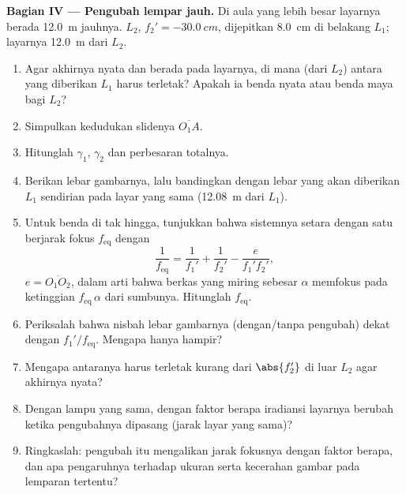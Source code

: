 \begin{problem}
\medskip
\noindent\textbf{Bagian IV --- Pengubah lempar jauh.}
Di aula yang lebih besar layarnya berada \qty{12.0}{m} jauhnya.  $L_2$, $f_2' = \qty{-30.0}{cm}$, dijepitkan \qty{8.0}{cm} di
belakang $L_1$; layarnya \qty{12.0}{m} dari $L_2$.
\begin{enumerate}[resume]
  \item Agar  akhirnya nyata dan berada pada layarnya, di mana
        (dari $L_2$)  antara yang diberikan $L_1$ harus
        terletak? Apakah ia benda nyata atau benda maya bagi $L_2$?
  \item Simpulkan kedudukan slidenya $\overline{O_1A}$.
  \item Hitunglah $\gamma_1$, $\gamma_2$ dan perbesaran totalnya.
  \item Berikan lebar gambarnya, lalu bandingkan dengan lebar yang akan
        diberikan $L_1$ sendirian pada layar yang sama (\qty{12.08}{m}
        dari $L_1$).
  \item Untuk benda di tak hingga, tunjukkan bahwa sistemnya setara
        dengan satu  berjarak fokus $f_{\mathrm{eq}}$ dengan
        \[
        \frac{1}{f_{\mathrm{eq}}} = \frac{1}{f_1'} + \frac{1}{f_2'} - \frac{e}{f_1' f_2'},
        \]
        $e = \overline{O_1O_2}$, dalam arti bahwa berkas yang miring
        sebesar $\alpha$ memfokus pada ketinggian
        $f_{\mathrm{eq}}\,\alpha$ dari sumbunya. Hitunglah
        $f_{\mathrm{eq}}$.
  \item Periksalah bahwa nisbah lebar gambarnya (dengan/tanpa pengubah)
        dekat dengan $f_1'/f_{\mathrm{eq}}$. Mengapa hanya hampir?
  \item Mengapa  antaranya harus terletak kurang dari
        $\abs{f_2'}$ di luar $L_2$ agar  akhirnya nyata?
  \item Dengan lampu yang sama, dengan faktor berapa iradiansi layarnya
        berubah ketika pengubahnya dipasang (jarak layar yang sama)?
  \item Ringkaslah: pengubah itu mengalikan jarak fokusnya dengan faktor
        berapa, dan apa pengaruhnya terhadap ukuran serta kecerahan
        gambar pada lemparan tertentu?
\end{enumerate}
\end{problem}
